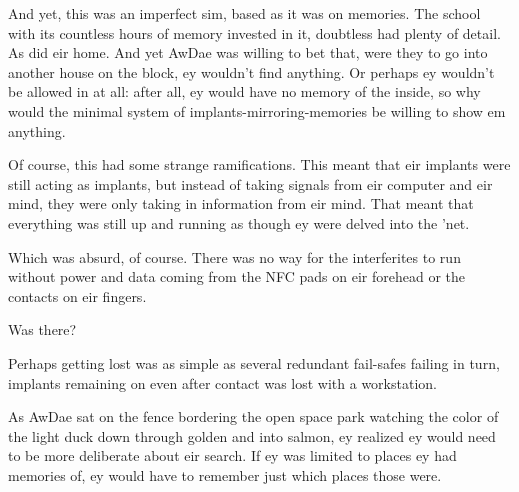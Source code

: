 And yet, this was an imperfect sim, based as it was on memories. The school with its countless hours of memory invested in it, doubtless had plenty of detail. As did eir home. And yet AwDae was willing to bet that, were they to go into another house on the block, ey wouldn't find anything. Or perhaps ey wouldn't be allowed in at all: after all, ey would have no memory of the inside, so why would the minimal system of implants-mirroring-memories be willing to show em anything.

Of course, this had some strange ramifications. This meant that eir implants were still acting as implants, but instead of taking signals from eir computer and eir mind, they were only taking in information from eir mind. That meant that everything was still up and running as though ey were delved into the 'net.

Which was absurd, of course. There was no way for the interferites to run without power and data coming from the NFC pads on eir forehead or the contacts on eir fingers.

Was there?

Perhaps getting lost was as simple as several redundant fail-safes failing in turn, implants remaining on even after contact was lost with a workstation.

As AwDae sat on the fence bordering the open space park watching the color of the light duck down through golden and into salmon, ey realized ey would need to be more deliberate about eir search. If ey was limited to places ey had memories of, ey would have to remember just which places those were.
